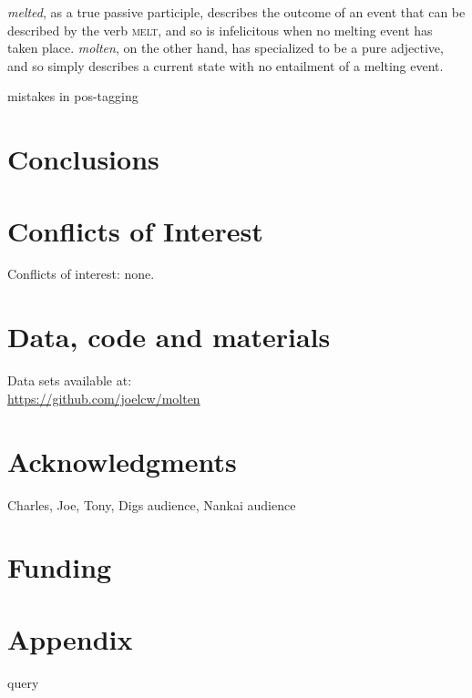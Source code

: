 \documentclass{artikel3}
\begin{document}
\noindent \textsl{melted}, as a true passive participle, describes the outcome of an event that can be described by the verb \textsc{melt}, and so is infelicitous when no melting event has taken place. \textsl{molten}, on the other hand, has specialized to be a pure adjective, and so simply describes a current state with no entailment of a melting event.


mistakes in pos-tagging

\section{Conclusions}




\section*{Conflicts of Interest}

Conflicts of interest: none.

\section*{Data, code and materials}

Data sets available at: \\
\url{https://github.com/joelcw/molten}\\


\section*{Acknowledgments}

Charles, Joe, Tony, Digs audience, Nankai audience


\section*{Funding}

\section*{Appendix}
query



%

%
  
\end{document}

